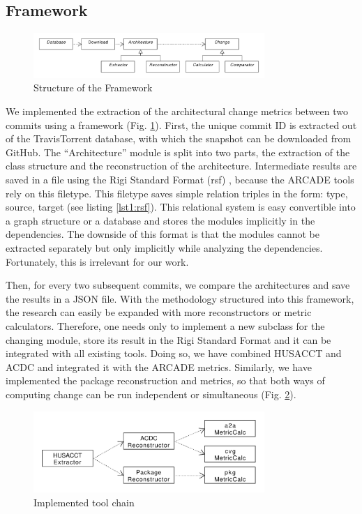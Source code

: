 \documentclass[sigplan, anonymous, review]{acmart}
\begin{document}
\subsection{Framework}

\begin{figure}[!t]
	\centering
	\includegraphics[width=3.45in]{assets/architecture.pdf}
	\caption{Structure of the Framework}
	\label{frameworkStructure}
\end{figure}

We implemented the extraction of the architectural change metrics between two commits using a framework (Fig. \ref{frameworkStructure}). First, the unique commit ID is extracted out of the TravisTorrent database, with which the snapshot can be downloaded from GitHub. 
The ``Architecture'' module is split into two parts, the extraction of the class structure and the reconstruction of the architecture. Intermediate results are saved in a file using the Rigi Standard Format (rsf) \cite{RSF}, because the ARCADE tools rely on this filetype. This filetype saves simple relation triples in the form: type, source, target (see listing \ref{lst1:rsf}). This relational system is easy convertible into a graph structure or a database and stores the modules implicitly in the dependencies. The downside of this format is that the modules cannot be extracted separately but only implicitly while analyzing the dependencies. Fortunately, this is irrelevant for our work.

Then, for every two subsequent commits, we compare the architectures and save the results in a JSON file. With the methodology structured into this framework, the research can easily be expanded with more reconstructors or metric calculators. Therefore, one needs only to implement a new subclass for the changing module, store its result in the Rigi Standard Format and it can be integrated with all existing tools. Doing so, we have combined HUSACCT and ACDC and integrated it with the ARCADE metrics. Similarly, we have implemented the package reconstruction and metrics, so that both ways of computing change can be run independent or simultaneous (Fig. \ref{implToolchain}).

\begin{figure}[!t]
	\centering
	\includegraphics[width=3.45in]{assets/implementedArc.pdf}
	\caption{Implemented tool chain}
	\label{implToolchain}
\end{figure}
\end{document}
